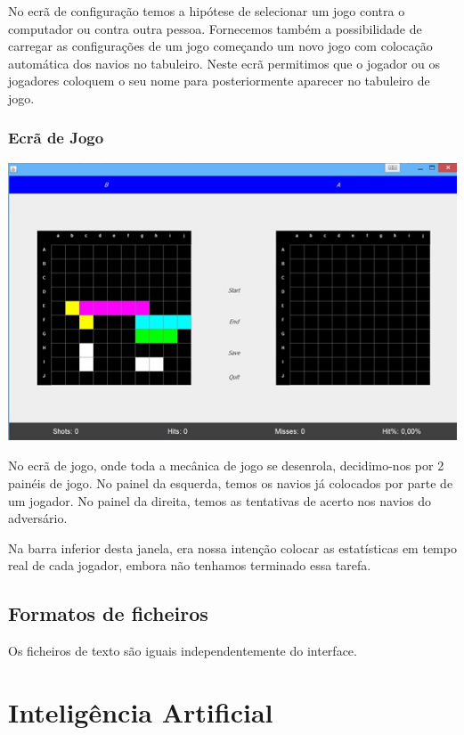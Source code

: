 \documentclass[12pt,a4paper,reqno]{report}
\numberwithin{equation}{section}
\begin{document}
No ecrã de configuração temos a hipótese de selecionar um jogo contra o computador ou contra outra pessoa. Fornecemos também a possibilidade de carregar as configurações de um jogo começando um novo jogo com colocação automática dos navios no tabuleiro. Neste ecrã permitimos que o jogador ou os jogadores coloquem o seu nome para posteriormente aparecer no tabuleiro de jogo.

\subsection{Ecrã de Jogo}

\begin{center}

\includegraphics[width=16cm]{ecradejogo.jpg}

\end{center}

No ecrã de jogo, onde toda a mecânica de jogo se desenrola, decidimo-nos por 2 painéis de jogo. No painel da esquerda, temos os navios já colocados por parte de um jogador. No painel da direita, temos as tentativas de acerto nos navios do adversário.

Na barra inferior desta janela, era nossa intenção colocar as estatísticas em tempo real de cada jogador, embora não tenhamos terminado essa tarefa.

\section{Formatos de ficheiros}

	Os ficheiros de texto são iguais independentemente do interface.

\chapter{Inteligência Artificial}
\end{document}
